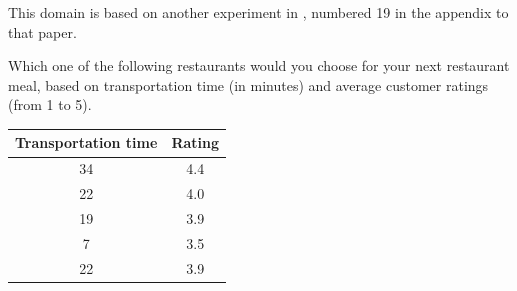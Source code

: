 This domain is based on another experiment in \citet{WedePett96}, numbered 19 in the appendix to that paper.

\begin{tcolorbox}
Which one of the following restaurants would you choose for your next restaurant meal, based on transportation time (in minutes) and average customer ratings (from
1 to 5).
	
\begin{tabular}{cc}
\hline
Transportation time & Rating \\ \hline
34 & 4.4 \\ 
22 & 4.0 \\ 
19 & 3.9 \\ 
7 & 3.5 \\ 
22 & 3.9 \\ \hline
\end{tabular}
\end{tcolorbox}
